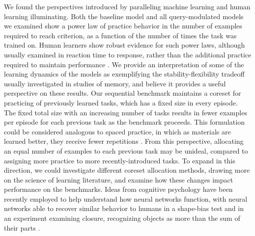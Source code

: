 We found the perspectives introduced by paralleling machine learning and human learning illuminating. Both the baseline model and all query-modulated models we examined show a power law of practice behavior in the number of examples required to reach criterion, as a function of the number of times the task was trained on. Human learners show robust evidence for such power laws, although usually examined in reaction time to response, rather than the additional practice required to maintain performance \parencite{Newell1980,Donner2015}. We provide an interpretation of some of the learning dynamics of the models as exemplifying the stability-flexibility tradeoff usually investigated in studies of memory, and believe it provides a useful perspective on these results. Our sequential benchmark maintains a coreset for practicing of previously learned tasks, which has a fixed size in every episode. The fixed total size with an increasing number of tasks results in fewer examples per episode for each previous task as the benchmark proceeds. This formulation could be considered analogous to spaced practice, in which as materials are learned better, they receive fewer repetitions \parencite{Spitzer1939,Greene2008}. From this perspective, allocating an equal number of examples to each previous task may be unideal, compared to assigning more practice to more recently-introduced tasks. To expand in this direction, we could investigate different coreset allocation methods, drawing more on the science of learning literature, and examine how these changes impact performance on the benchmarks. Ideas from cognitive psychology have been recently employed to help understand how neural networks function, with neural networks able to recover similar behavior to humans in a shape-bias test \parencite{Ritter2017} and in an experiment examining closure, recognizing objects as more than the sum of their parts \parencite{Kim2019}.
